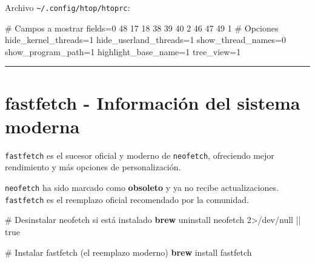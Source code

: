 \documentclass[
  11pt,
  letterpaper,
  oneside,
  openany]{scrbook}
\newenvironment{Shaded}{}{}
\newcommand{\CommentTok}[1]{\textcolor[rgb]{0.42,0.45,0.49}{#1}}
\newcommand{\DataTypeTok}[1]{\textcolor[rgb]{0.84,0.23,0.29}{#1}}
\newcommand{\DecValTok}[1]{\textcolor[rgb]{0.00,0.36,0.77}{#1}}
\newcommand{\ExtensionTok}[1]{\textcolor[rgb]{0.84,0.23,0.29}{\textbf{#1}}}
\newcommand{\FunctionTok}[1]{\textcolor[rgb]{0.44,0.26,0.76}{#1}}
\newcommand{\KeywordTok}[1]{\textcolor[rgb]{0.84,0.23,0.29}{#1}}
\newcommand{\NormalTok}[1]{\textcolor[rgb]{0.14,0.16,0.18}{#1}}
\newcommand{\OperatorTok}[1]{\textcolor[rgb]{0.14,0.16,0.18}{#1}}
\newcommand{\OtherTok}[1]{\textcolor[rgb]{0.44,0.26,0.76}{#1}}
\newcommand{\StringTok}[1]{\textcolor[rgb]{0.01,0.18,0.38}{#1}}
\begin{document}
Archivo \texttt{\textasciitilde{}/.config/htop/htoprc}:

\begin{Shaded}
\begin{Highlighting}[]
\CommentTok{\# Campos a mostrar}
\DataTypeTok{fields}\OtherTok{=}\StringTok{0 48 17 18 38 39 40 2 46 47 49 1}
\CommentTok{\# Opciones}
\DataTypeTok{hide\_kernel\_threads}\OtherTok{=}\DecValTok{1}
\DataTypeTok{hide\_userland\_threads}\OtherTok{=}\DecValTok{1}
\DataTypeTok{show\_thread\_names}\OtherTok{=}\DecValTok{0}
\DataTypeTok{show\_program\_path}\OtherTok{=}\DecValTok{1}
\DataTypeTok{highlight\_base\_name}\OtherTok{=}\DecValTok{1}
\DataTypeTok{tree\_view}\OtherTok{=}\DecValTok{1}
\end{Highlighting}
\end{Shaded}

\begin{center}\rule{0.5\linewidth}{0.5pt}\end{center}

\section{fastfetch - Información del sistema
moderna}\label{sec-fastfetch}

\texttt{fastfetch} es el sucesor oficial y moderno de \texttt{neofetch},
ofreciendo mejor rendimiento y más opciones de personalización.

\begin{tcolorbox}[enhanced jigsaw, toprule=.15mm, bottomrule=.15mm, opacityback=0, coltitle=black, rightrule=.15mm, colframe=quarto-callout-warning-color-frame, titlerule=0mm, opacitybacktitle=0.6, left=2mm, colback=white, bottomtitle=1mm, arc=.35mm, leftrule=.75mm, title=\textcolor{quarto-callout-warning-color}{\faExclamationTriangle}\hspace{0.5em}{⚠️ Migración desde neofetch}, colbacktitle=quarto-callout-warning-color!10!white, breakable, toptitle=1mm]

\texttt{neofetch} ha sido marcado como \textbf{obsoleto} y ya no recibe
actualizaciones. \texttt{fastfetch} es el reemplazo oficial recomendado
por la comunidad.

\begin{Shaded}
\begin{Highlighting}[]
\CommentTok{\# Desinstalar neofetch si está instalado}
\ExtensionTok{brew}\NormalTok{ uninstall neofetch }\DecValTok{2}\OperatorTok{\textgreater{}}\NormalTok{/dev/null }\KeywordTok{||} \FunctionTok{true}

\CommentTok{\# Instalar fastfetch (el reemplazo moderno)}
\ExtensionTok{brew}\NormalTok{ install fastfetch}
\end{Highlighting}
\end{Shaded}

\end{tcolorbox}
\end{document}
